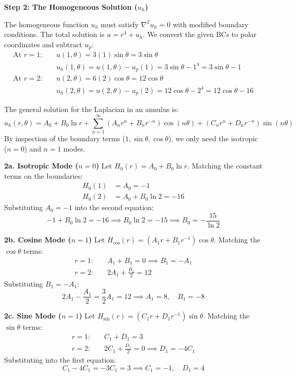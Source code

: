 \documentclass[a4paper,11pt]{article} %
\begin{document}
\textbf{Step 2: The Homogeneous Solution ($u_h$)}

The homogeneous function $u_h$ must satisfy $\nabla^2 u_h = 0$ with modified boundary conditions.
The total solution is $u = r^4 + u_h$.
We convert the given BCs to polar coordinates and subtract $u_p$:
\begin{align*}
    \text{At } r=1: \quad & u(1, \theta) = 3(1)\sin\theta = 3\sin\theta \\
    & u_h(1, \theta) = u(1, \theta) - u_p(1) = 3\sin\theta - 1^4 = 3\sin\theta - 1 \\
    \text{At } r=2: \quad & u(2, \theta) = 6(2)\cos\theta = 12\cos\theta \\
    & u_h(2, \theta) = u(2, \theta) - u_p(2) = 12\cos\theta - 2^4 = 12\cos\theta - 16
\end{align*}

The general solution for the Laplacian in an annulus is:
$$ u_h(r, \theta) = A_0 + B_0 \ln r + \sum_{n=1}^{\infty} (A_n r^n + B_n r^{-n})\cos(n\theta) + (C_n r^n + D_n r^{-n})\sin(n\theta) $$
By inspection of the boundary terms ($1, \sin\theta, \cos\theta$), we only need the isotropic ($n=0$) and $n=1$ modes.

\textbf{2a. Isotropic Mode ($n=0$)}
Let $H_0(r) = A_0 + B_0 \ln r$. Matching the constant terms on the boundaries:
\begin{align*}
    H_0(1) &= A_0 = -1 \\
    H_0(2) &= A_0 + B_0 \ln 2 = -16
\end{align*}
Substituting $A_0 = -1$ into the second equation:
$$ -1 + B_0 \ln 2 = -16 \implies B_0 \ln 2 = -15 \implies B_0 = -\frac{15}{\ln 2} $$

\textbf{2b. Cosine Mode ($n=1$)}
Let $H_{\cos}(r) = \left( A_1 r + B_1 r^{-1} \right) \cos\theta$. Matching the $\cos\theta$ terms:
\begin{align*}
    r=1: \quad & A_1 + B_1 = 0 \implies B_1 = -A_1 \\
    r=2: \quad & 2A_1 + \frac{B_1}{2} = 12
\end{align*}
Substituting $B_1 = -A_1$:
$$ 2A_1 - \frac{A_1}{2} = \frac{3}{2}A_1 = 12 \implies A_1 = 8, \quad B_1 = -8 $$

\textbf{2c. Sine Mode ($n=1$)}
Let $H_{\sin}(r) = \left( C_1 r + D_1 r^{-1} \right) \sin\theta$. Matching the $\sin\theta$ terms:
\begin{align*}
    r=1: \quad & C_1 + D_1 = 3 \\
    r=2: \quad & 2C_1 + \frac{D_1}{2} = 0 \implies D_1 = -4C_1
\end{align*}
Substituting into the first equation:
$$ C_1 - 4C_1 = -3C_1 = 3 \implies C_1 = -1, \quad D_1 = 4 $$
\end{document}
